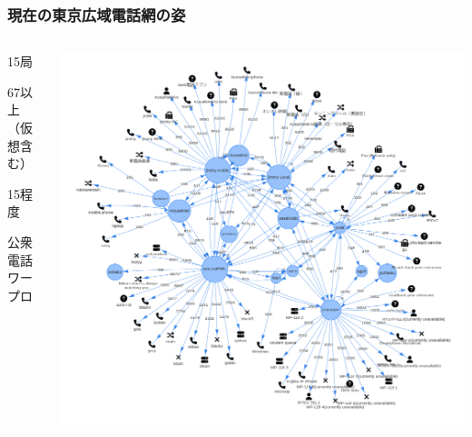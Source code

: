 \documentclass[
  lualatex,
  aspectratio=169,
  14pt
]{beamer}
\begin{document}
\begin{frame}
  \frametitle{現在の東京広域電話網の姿}

  \begin{columns}
    \begin{column}{.25\textwidth}
      \begin{description}[labelwidth=\linewidth]
        \item[交換局数]
          15局
        \item[端末数]
          67以上\\
          （仮想含む）
        \item[黒電話の数]
          15程度
        \item[その他]
          公衆電話\\
          ワープロ
      \end{description}
      ~
    \end{column}
    \begin{column}{.7\textwidth}
      \centering
      \includegraphics[height=\textheight]{./images/mantela.png}
    \end{column}
  \end{columns}
\end{frame}
\end{document}
